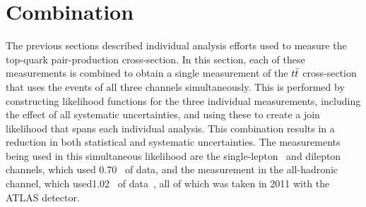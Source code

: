 
\section{Combination}
\label{sec:combination}


The previous sections described individual analysis efforts used to measure the top-quark pair-production cross-section.
In this section, each of these measurements is combined to obtain a single measurement of the $t\bar{t}$ cross-section 
that uses the events of all three channels simultaneously.
This is performed by constructing likelihood functions for the three individual measurements, including the effect of all
systematic uncertainties, and using these to create a join likelihood that spans each individual analysis.
This combination results in a reduction in both statistical and systematic uncertainties.
The measurements being used in this simultaneous likelihood are the single-lepton~\cite{LEPTON_JETS_NOTE_2011} and dilepton~\cite{DILEPTON_PAPER} channels,
which used 0.70 \ifb\ of data, and the measurement in the all-hadronic channel, 
which used1.02 \ifb\ of data~\cite{ATLAS-CONF-2011-140}, all of which was taken in 2011 with the ATLAS detector.


